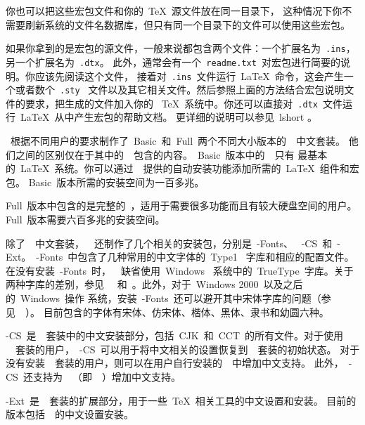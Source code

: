 \documentclass[a4paper]{article}
\begin{document}
你也可以把这些宏包文件和你的~\TeX{}~源文件放在同一目录下，
这种情况下你不需要刷新系统的文件名数据库，但只有同一个目录下的文件可以使用这些宏包。

如果你拿到的是宏包的源文件，一般来说都包含两个文件：一个扩展名为~\texttt{.ins}，
另一个扩展名为~\texttt{.dtx}。
此外，通常会有一个~\texttt{readme.txt}~对宏包进行简要的说明。你应该先阅读这个文件，
接着对~\texttt{.ins}~文件运行~\LaTeX{}~命令，这会产生一个或者数个~\texttt{.sty}~
文件以及其它相关文件。然后参照上面的方法结合宏包说明文件的要求，把生成的文件加入你的
~\TeX{}~系统中。你还可以直接对~\texttt{.dtx}~文件运行~\LaTeX{}~从中产生宏包的帮助文档。
更详细的说明可以参见~lshort \cite{lshort-cn}。


\CTeX{}~根据不同用户的要求制作了~Basic~和~Full~两个不同大小版本的~\CTeX{}~中文套装。
他们之间的区别仅在于其中的~\MiKTeX{}~包含的内容。~Basic~版本中的~\MiKTeX{}~只有
最基本的~\LaTeX{}~系统。你可以通过~\MiKTeX{}~提供的自动安装功能添加所需的~\LaTeX{}~组件和宏包。
Basic~版本所需的安装空间为一百多兆。

Full~版本中包含的是完整的~\MiKTeX{}，适用于需要很多功能而且有较大硬盘空间的用户。
Full~版本需要六百多兆的安装空间。


除了~\CTeX{}~中文套装，~\CTeX{}~还制作了几个相关的安装包，分别是~\CTeX{}-Fonts、
~\CTeX{}-CS~和~\CTeX{}-Ext。~\CTeX{}-Fonts~中包含了几种常用的中文字体的~Type1~
字库和相应的配置文件。在没有安装~\CTeX{}-Fonts~时，~\CTeX{}~缺省使用~Windows~
系统中的~TrueType~字库。关于两种字库的差别，参见~~
和~。此外，对于~Windows 2000~以及之后的~Windows~操作
系统，安装~\CTeX{}-Fonts~还可以避开其中宋体字库的问题（参见~~）。
目前包含的字体有宋体、仿宋体、楷体、黑体、隶书和幼圆六种。

\CTeX{}-CS~是~\CTeX{}~套装中的中文安装部分，包括~CJK~和~CCT~的所有文件。对于使用
~\CTeX{}~套装的用户，~\CTeX{}-CS~可以用于将中文相关的设置恢复到~\CTeX{}~套装的初始状态。
对于没有安装~\CTeX{}~套装的用户，则可以在用户自行安装的~\MiKTeX{}~中增加中文支持。
此外，~\CTeX{}-CS~还支持为~\fpTeX{}~（即~\TeXLive{}~）增加中文支持。

\CTeX{}-Ext~是~\CTeX{}~套装的扩展部分，用于一些~\TeX{}~相关工具的中文设置和安装。
目前的版本包括~\ConTeXt{}~的中文设置安装。
\end{document}
